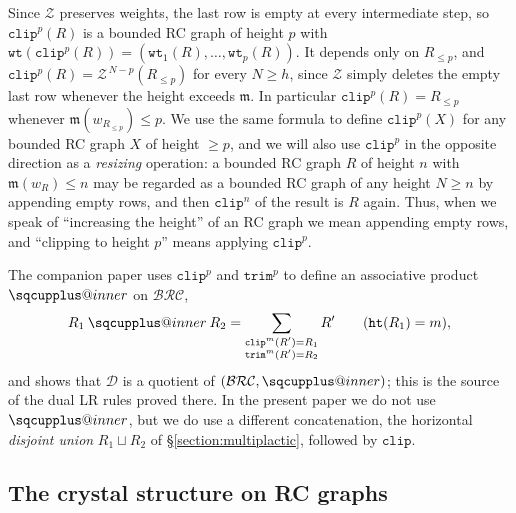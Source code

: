 \documentclass[pdflatex,sn-mathphys-num]{sn-jnl}
\makeatletter
\newcommand{\sqcupplus@inner}[2]{%
  \vcenter{\hbox{\ooalign{%
    \hfil$\m@th#1\sqcup$\hfil\cr
    \hfil\raisebox{0.15ex}{$\m@th#1\scriptscriptstyle+$}\hfil\cr
  }}}%
}
\newcommand{\sqcupplus}{\mathbin{\mathpalette\sqcupplus@inner\relax}}
\numberwithin{equation}{subsection}
\newcommand{\wof}[1]{w_{#1}}
\newcommand{\wtt}{\mathtt{wt}}
\newcommand{\trm}{\mathtt{trim}}
\newcommand{\zeromap}{\mathcal{Z}}
\newcommand{\hr}{\mathtt{ht}}
\newcommand{\clp}{\mathtt{clip}}
\newcommand{\BRC}{\mathcal{BRC}}
\newcommand{\dcoma}{\mathcal{D}}
\newcommand{\maxd}{\mathfrak{m}}
\theoremstyle{thmstyleone}
\theoremstyle{thmstylethree}
\theoremstyle{thmstyletwo}
\makeatother
\begin{document}
Since $\zeromap$ preserves weights, the last row is empty at every intermediate step, so $\clp^p(R)$ is a bounded RC graph of height $p$ with $\wtt(\clp^p(R))=(\wtt_1(R),\ldots,\wtt_p(R))$. It depends only on $R_{\leq p}$, and $\clp^p(R)=\zeromap^{\,N-p}(R_{\leq p})$ for every $N\geq h$, since $\zeromap$ simply deletes the empty last row whenever the height exceeds $\maxd$. In particular $\clp^p(R)=R_{\leq p}$ whenever $\maxd(\wof{R_{\leq p}})\leq p$. We use the same formula to define $\clp^p(X)$ for any bounded RC graph $X$ of height $\geq p$, and we will also use $\clp^p$ in the opposite direction as a \emph{resizing} operation: a bounded RC graph $R$ of height $n$ with $\maxd(\wof R)\leq n$ may be regarded as a bounded RC graph of any height $N\geq n$ by appending empty rows, and then $\clp^n$ of the result is $R$ again. Thus, when we speak of ``increasing the height'' of an RC graph we mean appending empty rows, and ``clipping to height $p$'' means applying $\clp^p$.

The companion paper uses $\clp^p$ and $\trm^p$ to define an associative product $\sqcupplus$ on $\BRC$,
$$R_1\sqcupplus R_2 = \sum_{\substack{\clp^m(R')=R_1\\ \trm^m(R')=R_2}}R'\qquad(\hr(R_1)=m),$$
and shows that $\dcoma$ is a quotient of $(\BRC,\sqcupplus)$; this is the source of the dual LR rules proved there. In the present paper we do not use $\sqcupplus$, but we do use a different concatenation, the horizontal \emph{disjoint union} $R_1\sqcup R_2$ of \S\ref{section:multiplactic}, followed by $\clp$.

\subsection{The crystal structure on RC graphs}\label{section:crystalbackground}
\end{document}
